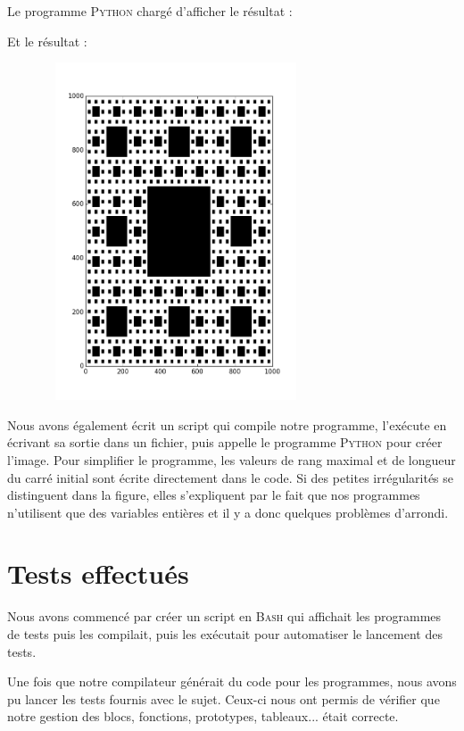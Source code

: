 \documentclass[french]{article}
\begin{document}
Le programme \textsc{Python} chargé d'afficher le résultat :


Et le résultat :

\begin{center}
\includegraphics[width=10cm, height=10cm]{../sierpinski.png}
\end{center}

Nous avons également écrit un script qui compile notre programme, l'exécute en écrivant sa sortie dans un fichier, puis appelle le programme \textsc{Python} pour créer l'image. Pour simplifier le programme, les valeurs de rang maximal et de longueur du carré initial sont écrite directement dans le code. Si des petites irrégularités se distinguent dans la figure, elles s'expliquent par le fait que nos programmes n'utilisent que des variables entières et il y a donc quelques problèmes d'arrondi.

\section{Tests effectués}
Nous avons commencé par créer un script en \textsc{Bash} qui affichait les programmes de tests puis les compilait, puis les exécutait pour automatiser le lancement des tests.

Une fois que notre compilateur générait du code pour les programmes, nous avons pu lancer les tests fournis avec le sujet. Ceux-ci nous ont permis de vérifier que notre gestion des blocs, fonctions, prototypes, tableaux... était correcte.
\end{document}
